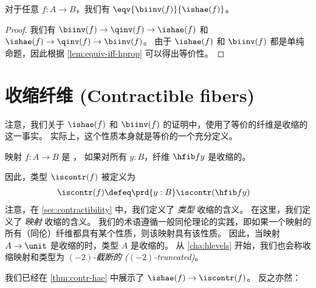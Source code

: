 \begin{cor}\label{thm:equiv-biinv-isequiv}
对于任意 $f:A\to B$，我们有 $\eqv{\biinv(f)}{\ishae(f)}$。
\end{cor}
\begin{proof}
  我们有 $\biinv(f) \to \qinv(f) \to \ishae(f)$ 和 $\ishae(f) \to \qinv(f) \to \biinv(f)$。
  由于 $\ishae(f)$ 和 $\biinv(f)$ 都是单纯命题，因此根据 \cref{lem:equiv-iff-hprop} 可以得出等价性。
\end{proof}

%
%
%

\section{收缩纤维 (Contractible fibers)}
\label{sec:contrf}

%
%
%

注意，我们关于 $\ishae(f)$ 和 $\biinv(f)$ 的证明中，使用了等价的纤维是收缩的这一事实。
实际上，这个性质本身就是等价的一个充分定义。

\begin{defn} \label{defn:equivalence}
映射 $f:A\to B$ 是 ，
如果对所有 $y:B$，纤维 $\hfib f y$ 是收缩的。
\end{defn}

因此，类型 $\iscontr(f)$ 被定义为
\begin{align}
  \iscontr(f) &\defeq \prd{y:B} \iscontr(\hfib f y)\label{eq:iscontrf}
\end{align}
注意，在 \cref{sec:contractibility} 中，我们定义了 \emph{类型} 收缩的含义。
在这里，我们定义了 \emph{映射} 收缩的含义。
我们的术语遵循一般同伦理论的实践，即如果一个映射的所有（同伦）纤维都具有某个性质，则该映射具有该性质。
因此，当映射 $A\to\unit$ 是收缩的时，类型 $A$ 是收缩的。
从 \cref{cha:hlevels} 开始，我们也会称收缩映射和类型为 \emph{$(-2)$-截断的 ($(-2)$-truncated)}。

我们已经在 \cref{thm:contr-hae} 中展示了 $\ishae(f) \to \iscontr(f)$。
反之亦然：

